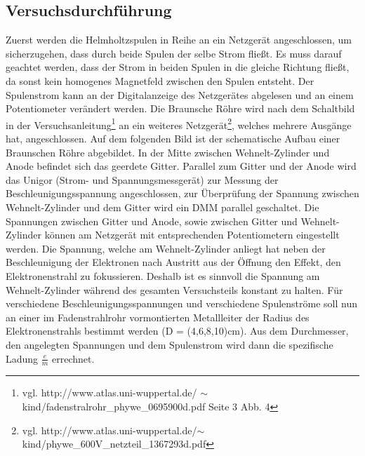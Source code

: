 \documentclass[12pt,a4paper]{article}
\begin{document}
\subsection{Versuchsdurchführung}
Zuerst werden die Helmholtzspulen in Reihe an ein Netzgerät angeschlossen, um sicherzugehen, dass durch beide Spulen der selbe Strom fließt. Es muss darauf geachtet werden, dass der Strom in beiden Spulen in die gleiche Richtung fließt, da sonst kein homogenes Magnetfeld zwischen den Spulen entsteht. Der Spulenstrom kann an der Digitalanzeige des Netzgerätes abgelesen und an einem Potentiometer verändert werden. Die Braunsche Röhre wird nach dem Schaltbild in der Versuchsanleitung\footnote{vgl. http://www.atlas.uni-wuppertal.de/
$\sim$kind/fadenstralrohr\_phywe\_0695900d.pdf Seite 3 Abb. 4} an ein weiteres Netzgerät\footnote{vgl. http://www.atlas.uni-wuppertal.de/$\sim$kind/phywe\_600V\_netzteil\_1367293d.pdf}, welches mehrere Ausgänge hat, angeschlossen. Auf dem folgenden Bild ist der schematische Aufbau einer Braunschen Röhre abgebildet.
In der Mitte zwischen Wehnelt-Zylinder und Anode befindet sich das geerdete Gitter. Parallel zum Gitter und der Anode wird das Unigor (Strom- und Spannungsmessgerät) zur Messung der Beschleunigungsspannung angeschlossen, zur Überprüfung der Spannung zwischen Wehnelt-Zylinder und dem Gitter wird ein DMM parallel geschaltet. Die Spannungen zwischen Gitter und Anode, sowie zwischen Gitter und Wehnelt-Zylinder können am Netzgerät mit entsprechenden Potentiometern eingestellt werden. Die Spannung, welche am Wehnelt-Zylinder anliegt hat neben der Beschleunigung der Elektronen nach Austritt aus der Öffnung den Effekt, den Elektronenstrahl zu fokussieren. Deshalb ist es sinnvoll die Spannung am Wehnelt-Zylinder während des gesamten Versuchsteils konstant zu halten. Für verschiedene Beschleunigungsspannungen und verschiedene Spulenströme soll nun an einer im Fadenstrahlrohr vormontierten Metallleiter der Radius des Elektronenstrahls bestimmt werden (D = (4,6,8,10)cm). Aus dem Durchmesser, den angelegten Spannungen und dem Spulenstrom wird dann die spezifische Ladung $\frac{e}{m}$ errechnet.
\end{document}

